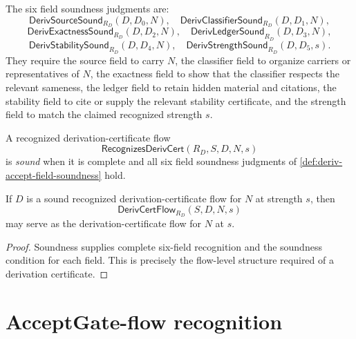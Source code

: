 \begin{definition}
\label{def:deriv-accept-field-soundness}
The six field soundness judgments are:
$$
  \mathsf{DerivSourceSound}_{R_D}(D,D_0,N),
  \quad
  \mathsf{DerivClassifierSound}_{R_D}(D,D_1,N),
$$
$$
  \mathsf{DerivExactnessSound}_{R_D}(D,D_2,N),
  \quad
  \mathsf{DerivLedgerSound}_{R_D}(D,D_3,N),
$$
$$
  \mathsf{DerivStabilitySound}_{R_D}(D,D_4,N),
  \quad
  \mathsf{DerivStrengthSound}_{R_D}(D,D_5,s).
$$
They require the source field to carry $N$, the classifier field to organize carriers or representatives of $N$, the exactness field to show that the classifier respects the relevant sameness, the ledger field to retain hidden material and citations, the stability field to cite or supply the relevant stability certificate, and the strength field to match the claimed recognized strength $s$.
\end{definition}

\begin{definition}
\label{def:deriv-accept-sound-derivcert}
A recognized derivation-certificate flow
$$
  \mathsf{RecognizesDerivCert}(R_D,S,D,N,s)
$$
is \emph{sound} when it is complete and all six field soundness judgments of \autoref{def:deriv-accept-field-soundness} hold.
\end{definition}

\begin{theorem}
\label{thm:deriv-accept-sound-derivcert-establishes}
If $D$ is a sound recognized derivation-certificate flow for $N$ at strength $s$, then
$$
  \mathsf{DerivCertFlow}_{R_D}(S,D,N,s)
$$
may serve as the derivation-certificate flow for $N$ at $s$.
\end{theorem}

\begin{proof}
Soundness supplies complete six-field recognition and the soundness condition for each field. This is precisely the flow-level structure required of a derivation certificate.
\end{proof}

\section{AcceptGate-flow recognition}
\label{sec:deriv-accept-acceptgate-recognition}


